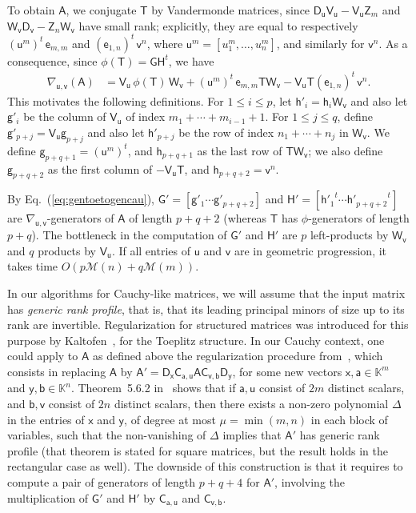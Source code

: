 \documentclass[sigconf]{acmart}
\newcommand{\va}{\ensuremath{\mathsf{a}}}
\newcommand{\vb}{\ensuremath{\mathsf{b}}}
\newcommand{\ve}{\ensuremath{\mathsf{e}}}
\newcommand{\vg}{\ensuremath{\mathsf{g}}}
\newcommand{\vh}{\ensuremath{\mathsf{h}}}
\newcommand{\vu}{\ensuremath{\mathsf{u}}}
\newcommand{\vv}{\ensuremath{\mathsf{v}}}
\newcommand{\vx}{\ensuremath{\mathsf{x}}}
\newcommand{\vy}{\ensuremath{\mathsf{y}}}
\newcommand{\mA}{\ensuremath{\mathsf{A}}}
\newcommand{\mC}{\ensuremath{\mathsf{C}}}
\newcommand{\mD}{\ensuremath{\mathsf{D}}}
\newcommand{\mG}{\ensuremath{\mathsf{G}}}
\newcommand{\mH}{\ensuremath{\mathsf{H}}}
\newcommand{\mT}{\ensuremath{\mathsf{T}}}
\newcommand{\mV}{\ensuremath{\mathsf{V}}}
\newcommand{\mW}{\ensuremath{\mathsf{W}}}
\newcommand{\mZ}{\ensuremath{\mathsf{Z}}}
\newcommand{\K}{\ensuremath{\mathbb{K}}}
\newcommand{\M}{\ensuremath{\mathscr{M}}}
\newcommand{\mn}{\ensuremath{\mu}}
\theoremstyle{acmdefinition}
\begin{document}
To obtain $\mA$, we conjugate $\mT$ by Vandermonde matrices, since $
\mD_{\vu} \mV_{\vu} - \mV_{\vu} \mZ_m$ and $ \mW_{\vv} \mD_{\vv} -
\mZ_n \mW_{\vv}$ have small rank; explicitly, they are equal to
respectively $(\vu^m)^t \, \ve_{m,m}$ and $(\ve_{1,n})^t \, \vv^n$,
where $\vu^m = [ u_1^m , \dots,  u_n^m ]$,
and similarly for $\vv^n$. As a
consequence, since $\phi(\mT)=\mG \mH^t$, we have
\begin{align}\label{eq:gentoetogencau}
  \nabla_{\vu, \vv} \left( \mA \right) 
  & =  \mV_{\vu}\, \phi(\mT)\, \mW_{\vv} 
  + (\vu^m)^t \, \ve_{m,m}  \mT  \mW_{\vv} 
        - \mV_{\vu}  \mT  (\ve_{1,n})^t \, \vv^n. 
\end{align}
This motivates the following definitions. For $1 \le i \le p$, let
$\vh'_i=\vh_i \mW_\vv$ and also let $\vg'_{i}$ be the column of
$\mV_\vu$ of index $m_1 + \cdots +m_{i-1}+1$. For $1 \le j \le q$,
define $\vg'_{p+j} = \mV_\vu \vg_{p+j}$ and also let $\vh'_{p+j}$ be
the row of index $n_1 + \cdots +n_j$ in $\mW_\vv$.  We define
$\vg_{p+q+1} = (\vu^m)^t$, and $\vh_{p+q+1}$ as the last row of
$\mT \mW_\vv$; we also define $\vg_{p+q+2}$ as the first column of
$-\mV_\vu \mT$, and $\vh_{p+q+2} = \vv^n$.

By Eq.~(\ref{eq:gentoetogencau}),
$\mG'= [ \vg'_1  \cdots  \vg'_{p+q+2}]$ and
$\mH' =[ {\vh'_1}^t  \cdots  {\vh'_{p+q+2}}^t]$ are
$\nabla_{\vu,\vv}$-generators of $\mA$ of length $p+q+2$ (whereas
$\mT$ has $\phi$-generators of length $p+q$). The bottleneck in the
computation of $\mG'$ and $\mH'$ are $p$ left-products by $\mW_\vv$
and $q$ products by $\mV_\vu$.  If all entries of $\vu$ and $\vv$ are
in geometric progression, it takes time $O(p \M(n) + q \M(m))$.

\smallskip{}  In our algorithms for
Cauchy-like matrices, we will assume that the input matrix has {\em
  generic rank profile}, that is, that its leading principal minors of
size up to its rank are invertible.  Regularization for structured
matrices was introduced for this purpose by
Kaltofen~\cite{Kaltofen94}, for the Toeplitz structure. In our Cauchy
context, one could apply to $\mA$ as defined above the regularization
procedure from~\cite[Section~5.6]{Pan01}, which consists in replacing
$\mA$ by $\mA' = \mD_\vx \mC_{\va,\vu} \mA \mC_{\vv,\vb}\mD_\vy$,
for some new vectors $\vx,\va \in \K^m$ and $\vy,\vb \in
\K^n$. Theorem~5.6.2 in~\cite{Pan01} shows that if $\va,\vu$ consist
of $2m$ distinct scalars, and $\vb,\vv$ consist of $2n$ distinct
scalars, then there exists a non-zero polynomial $\Delta$ in the
entries of $\vx$ and $\vy$, of degree at most $\mn=\min(m,n)$ in each
block of variables, such that the non-vanishing of $\Delta$ implies
that $\mA'$ has generic rank profile (that theorem is stated for
square matrices, but the result holds in the rectangular case as
well).  The downside of this construction is that it requires to
compute a pair of generators of length $p+q+4$ for $\mA'$, involving
the multiplication of $\mG'$ and $\mH'$ by $\mC_{\va,\vu}$ and
$\mC_{\vv,\vb}$.
\end{document}
